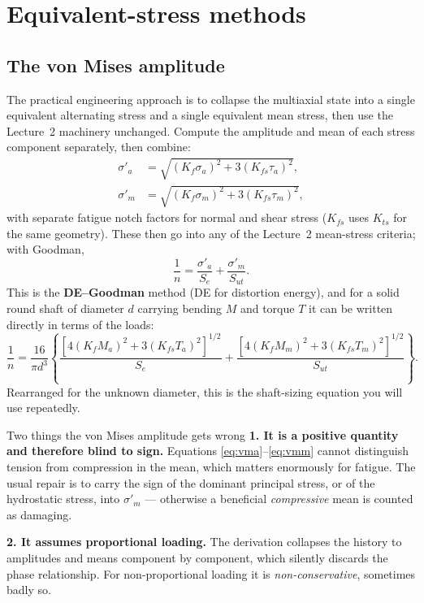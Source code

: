 \documentclass[11pt,a4paper]{article}
\begin{document}
\section{Equivalent-stress methods}

\subsection{The von Mises amplitude}
The practical engineering approach is to collapse the multiaxial state into a single equivalent alternating stress and a single equivalent mean stress, then use the Lecture~2 machinery unchanged. Compute the amplitude and mean of each stress component separately, then combine:
\begin{align}
  \sigma'_a&=\sqrt{\left(K_f\sigma_{a}\right)^{2}+3\left(K_{fs}\tau_{a}\right)^{2}}, \label{eq:vma}\\
  \sigma'_m&=\sqrt{\left(K_f\sigma_{m}\right)^{2}+3\left(K_{fs}\tau_{m}\right)^{2}}, \label{eq:vmm}
\end{align}
with separate fatigue notch factors for normal and shear stress ($K_{fs}$ uses $K_{ts}$ for the same geometry). These then go into any of the Lecture~2 mean-stress criteria; with Goodman,
\begin{equation}
  \frac{1}{n}=\frac{\sigma'_a}{S_e}+\frac{\sigma'_m}{S_{ut}} .
  \label{eq:degoodman}
\end{equation}
This is the \textbf{DE--Goodman} method (DE for distortion energy), and for a solid round shaft of diameter $d$ carrying bending $M$ and torque $T$ it can be written directly in terms of the loads:
\begin{equation}
  \frac{1}{n}=\frac{16}{\pi d^{3}}\left\{
  \frac{\left[4(K_fM_a)^{2}+3(K_{fs}T_a)^{2}\right]^{1/2}}{S_e}
  +\frac{\left[4(K_fM_m)^{2}+3(K_{fs}T_m)^{2}\right]^{1/2}}{S_{ut}}\right\}.
  \label{eq:shaft}
\end{equation}
Rearranged for the unknown diameter, this is the shaft-sizing equation you will use repeatedly.

\begin{aerobox}{Two things the von Mises amplitude gets wrong}
\textbf{1. It is a positive quantity and therefore blind to sign.} Equations \eqref{eq:vma}--\eqref{eq:vmm} cannot distinguish tension from compression in the mean, which matters enormously for fatigue. The usual repair is to carry the sign of the dominant principal stress, or of the hydrostatic stress, into $\sigma'_m$ --- otherwise a beneficial \emph{compressive} mean is counted as damaging.

\medskip
\textbf{2. It assumes proportional loading.} The derivation collapses the history to amplitudes and means component by component, which silently discards the phase relationship. For non-proportional loading it is \emph{non-conservative}, sometimes badly so.
\end{aerobox}
\end{document}
